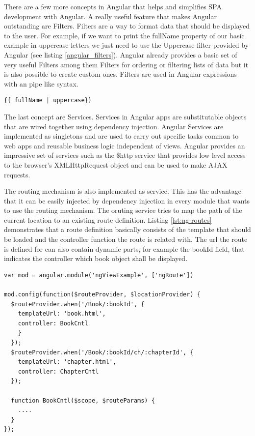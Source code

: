 There are a few more concepts in Angular that helps and simplifies SPA development with Angular.
A really useful feature that makes Angular outstanding are Filters.
Filters are a way to format data that should be displayed to the user.
For example, if we want to print the fullName property of our basic example in uppercase letters we just need to use the Uppercase filter provided by Angular (see listing \ref{angular_filters}).
Angular already provides a basic set of very useful Filters among them Filters for ordering or filtering lists of data but it is also possible to create custom ones.
Filters are used in Angular expressions with an pipe like syntax.

\begin{lstlisting}[label=angular_filters,caption=Angular Filters]
 {{ fullName | uppercase}}
\end{lstlisting}

The last concept are Services.
Services in Angular apps are substitutable objects that are wired together using dependency injection. Angular Services are implemented as singletons and are used to carry out specific tasks common to web apps and reusable business logic independent of views. Angular provides an impressive set of services such as the \$http service that provides low level access to the browser's XMLHttpRequest object and can be used to make AJAX requests.

The routing mechanism is also implemented as service. This has the advantage that it can be easily injected by dependency injection in every module that wants to use the routing mechanism. The oruting service tries to map the path of the current location to an existing route definition. Listing \ref{lst:ng-routes} demonstrates that a route definition basically consists of the template that should be loaded and the controller function the route is related with. The url the route is defined for can also contain dynamic parts, for example the bookId field, that indicates the controller which book object shall be displayed.

\begin{lstlisting}[label=lst:ng-routes,caption=Route definition in AngularJS]
var mod = angular.module('ngViewExample', ['ngRoute'])
 
mod.config(function($routeProvider, $locationProvider) {
  $routeProvider.when('/Book/:bookId', {
    templateUrl: 'book.html',
    controller: BookCntl
    }
  });
  $routeProvider.when('/Book/:bookId/ch/:chapterId', {
    templateUrl: 'chapter.html',
    controller: ChapterCntl
  });
  
  function BookCntl($scope, $routeParams) {
	....
  }
});
\end{lstlisting}

